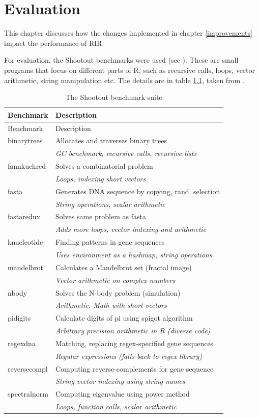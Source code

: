 \chapter{Evaluation\label{evaluation}}

This chapter discusses how the changes implemented in chapter \ref{improvements} impact the performance of RIR.

For evaluation, the Shootout benchmarks were used (see \autocite{fastr, shootout}). These are small programs that focus on different parts of R, such as recursive calls, loops, vector arithmetic, string manipulation etc. The details are in table \ref{tab:shootout}, taken from \autocite{fastr}.

\begin{longtable}[c]{@{}ll@{}}
\caption{The Shootout benchmark suite\label{tab:shootout}} \tabularnewline
\toprule
Benchmark & Description \tabularnewline
\midrule
\endfirsthead
\toprule
Benchmark & Description \tabularnewline
\midrule
\endhead
binarytrees & Allocates and traverses binary trees \tabularnewline
& \emph{GC benchmark, recursive calls, recursive lists} \tabularnewline
fannkuchred & Solves a combinatorial problem \tabularnewline
& \emph{Loops, indexing short vectors} \tabularnewline
fasta & Generates DNA sequence by copying, rand. selection \tabularnewline
& \emph{String operations, scalar arithmetic} \tabularnewline
fastaredux & Solves same problem as fasta \tabularnewline
& \emph{Adds more loops, vector indexing and arithmetic} \tabularnewline
knucleotide & Finding patterns in gene sequences \tabularnewline
& \emph{Uses environment as a hashmap, string operations} \tabularnewline
mandelbrot & Calculates a Mandelbrot set (fractal image) \tabularnewline
& \emph{Vector arithmetic on complex numbers} \tabularnewline
nbody & Solves the N-body problem (simulation) \tabularnewline
& \emph{Arithmetic, Math with short vectors} \tabularnewline
pidigits & Calculate digits of pi using spigot algorithm \tabularnewline
& \emph{Arbitrary precision arithmetic in R (diverse code)} \tabularnewline
regexdna & Matching, replacing regex-specified gene sequences \tabularnewline
& \emph{Regular expressions (falls back to regex library)} \tabularnewline
reversecompl & Computing reverse-complements for gene sequence \tabularnewline
& \emph{String vector indexing using string names} \tabularnewline
spectralnorm & Computing eigenvalue using power method \tabularnewline
& \emph{Loops, function calls, scalar arithmetic} \tabularnewline
\bottomrule
\end{longtable}

